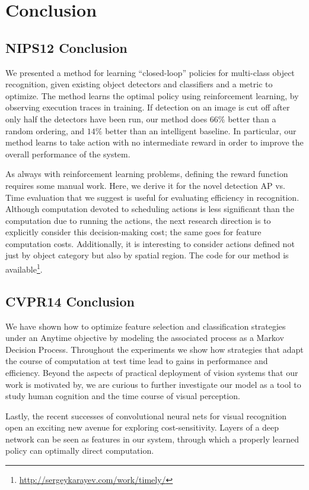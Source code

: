 \chapter{Conclusion}

\section{NIPS12 Conclusion}
We presented a method for learning ``closed-loop'' policies for multi-class object recognition, given existing object detectors and classifiers and a metric to optimize.
The method learns the optimal policy using reinforcement learning, by observing execution traces in training.
If detection on an image is cut off after only half the detectors have been run, our method does $66\%$ better than a random ordering, and $14\%$ better than an intelligent baseline.
In particular, our method learns to take action with no intermediate reward in order to improve the overall performance of the system.

As always with reinforcement learning problems, defining the reward function requires some manual work.
Here, we derive it for the novel detection AP vs. Time evaluation that we suggest is useful for evaluating efficiency in recognition.
Although computation devoted to scheduling actions is less significant than the computation due to running the actions, the next research direction is to explicitly consider this decision-making cost; the same goes for feature computation costs.
Additionally, it is interesting to consider actions defined not just by object category but also by spatial region.
The code for our method is available\footnote{\url{http://sergeykarayev.com/work/timely/}}.

\section{CVPR14 Conclusion}
We have shown how to optimize feature selection and classification strategies under an Anytime objective by modeling the associated process as a Markov Decision Process.
Throughout the experiments we show how strategies that adapt the course of computation at test time lead to gains in performance and efficiency.
Beyond the aspects of practical deployment of vision systems that our work is motivated by, we are curious to further investigate our model as a tool to study human cognition and the time course of visual perception.

Lastly, the recent successes of convolutional neural nets for visual recognition open an exciting new avenue for exploring cost-sensitivity.
Layers of a deep network can be seen as features in our system, through which a properly learned policy can optimally direct computation.
